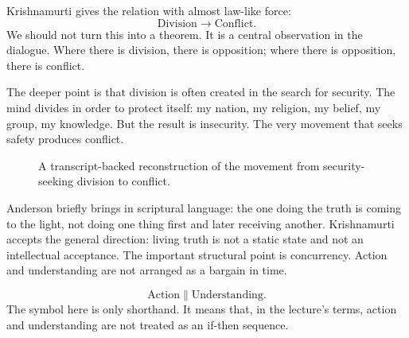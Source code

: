 Krishnamurti gives the relation with almost law-like force:
\begin{equation}
\mathrm{Division}
\longrightarrow
\mathrm{Conflict}.
\end{equation}
We should not turn this into a theorem. It is a central observation in the dialogue. Where there is division, there is opposition; where there is opposition, there is conflict.

The deeper point is that division is often created in the search for security. The mind divides in order to protect itself: my nation, my religion, my belief, my group, my knowledge. But the result is insecurity. The very movement that seeks safety produces conflict.

\begin{figure}
\centering
{}
\caption{A transcript-backed reconstruction of the movement from security-seeking division to conflict.}
\end{figure}

Anderson briefly brings in scriptural language: the one doing the truth is coming to the light, not doing one thing first and later receiving another. Krishnamurti accepts the general direction: living truth is not a static state and not an intellectual acceptance. The important structural point is concurrency. Action and understanding are not arranged as a bargain in time.

\begin{equation}
\mathrm{Action}
\parallel
\mathrm{Understanding}.
\end{equation}
The symbol here is only shorthand. It means that, in the lecture's terms, action and understanding are not treated as an if-then sequence.

